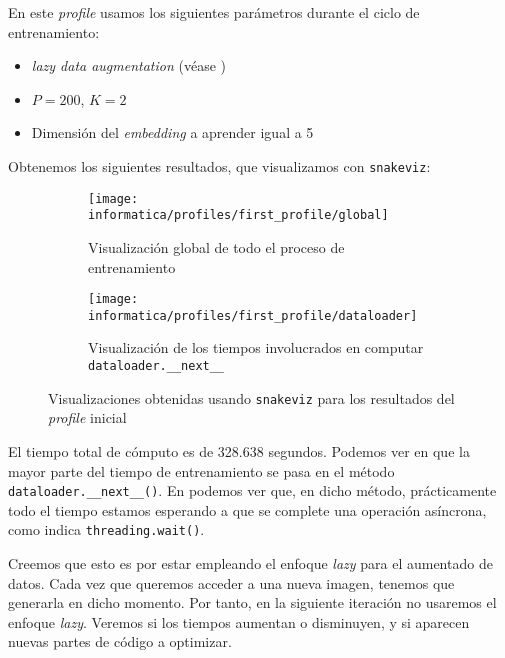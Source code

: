 En este \textit{profile} usamos los siguientes parámetros durante el ciclo de entrenamiento:

\begin{itemize}
    \item \textit{lazy data augmentation} (véase )
    \item $P = 200$, $K = 2$
    \item Dimensión del \textit{embedding} a aprender igual a 5
\end{itemize}

Obtenemos los siguientes resultados, que visualizamos con \lstinline{snakeviz}:

\begin{figure}[H]
\centering
    \begin{subfigure}{.4\textwidth}
        \centering
        \texttt{[image: informatica/profiles/first\_profile/global]}
        \caption{Visualización global de todo el proceso de entrenamiento}
        \label{img:first_profile_global}
    \end{subfigure}%
    \begin{subfigure}{.6\textwidth}
        \centering
        \texttt{[image: informatica/profiles/first\_profile/dataloader]}
        \caption{Visualización de los tiempos involucrados en computar \lstinline{dataloader.__next__}}
        \label{img:first_profile_dataloader_next}
    \end{subfigure}
\caption{Visualizaciones obtenidas usando \lstinline{snakeviz} para los resultados del \textit{profile} inicial}
\end{figure}


El tiempo total de cómputo es de 328.638 segundos. Podemos ver en  que la mayor parte del tiempo de entrenamiento se pasa en el método \lstinline{dataloader.__next__()}. En  podemos ver que, en dicho método, prácticamente todo el tiempo estamos esperando a que se complete una operación asíncrona, como indica \lstinline{threading.wait()}.

Creemos que esto es por estar empleando el enfoque \textit{lazy} para el aumentado de datos. Cada vez que queremos acceder a una nueva imagen, tenemos que generarla en dicho momento. Por tanto, en la siguiente iteración no usaremos el enfoque \textit{lazy}. Veremos si los tiempos aumentan o disminuyen, y si aparecen nuevas partes de código a optimizar.

